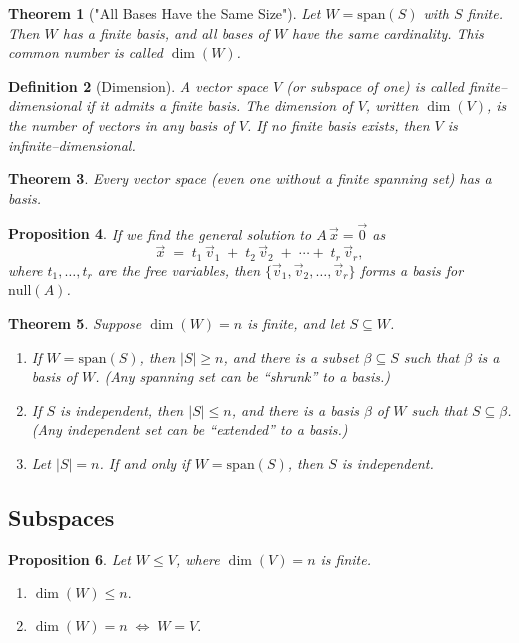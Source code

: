 \documentclass[12pt]{article}
\theoremstyle{break}             %
\newtheorem{thm}{Theorem}          %
\newtheorem{prop}[thm]{Proposition}%
\newtheorem{defn}[thm]{Definition}
\begin{document}
\begin{thm}["All Bases Have the Same Size"]
Let \(W = \mathrm{span}(S)\) with \(S\) finite. Then \(W\) has a finite basis, and \emph{all} bases of \(W\) have the same cardinality. This common number is called \(\dim(W)\).
\end{thm}

\begin{defn}[Dimension]
A vector space \(V\) (or subspace of one) is called \emph{finite–dimensional} if it admits a finite basis.  The \emph{dimension} of \(V\), written \(\dim(V)\), is the number of vectors in any basis of \(V\).  If no finite basis exists, then \(V\) is \emph{infinite–dimensional}.
\end{defn}

\begin{thm}
Every vector space (even one without a finite spanning set) has a basis.
\end{thm}

\begin{prop}
If we find the general solution to \(A\,\vec{x} = \vec{0}\) as 
\[
\vec{x} \;=\; t_1\,\vec{v}_1 \;+\; t_2\,\vec{v}_2 \;+\;\cdots+\; t_r\,\vec{v}_r,
\]
where \(t_1,\dots,t_r\) are the free variables, then \(\{\vec{v}_1,\vec{v}_2,\dots,\vec{v}_r\}\) forms a basis for \(\mathrm{null}(A)\).
\end{prop}

\begin{thm}
Suppose \(\dim(W) = n\) is finite, and let \(S \subseteq W\).
\begin{enumerate}
\item If \(W = \mathrm{span}(S)\), then \(\lvert S\rvert \ge n\), and there is a subset \(\beta \subseteq S\) such that \(\beta\) is a basis of \(W\).  
(Any spanning set can be ``shrunk'' to a basis.)
\item If \(S\) is independent, then \(\lvert S\rvert \le n\), and there is a basis \(\beta\) of \(W\) such that \(S \subseteq \beta\).  
(Any independent set can be ``extended'' to a basis.)
\item Let \(\lvert S\rvert = n\). If and only if \(W = \mathrm{span}(S)\), then \(S\) is independent.
\end{enumerate}
\end{thm}

\subsection{Subspaces}

\begin{prop}
Let \(W \leq V\), where \(\dim(V) = n\) is finite.
\begin{enumerate}
\item \(\dim(W) \le n.\)
\item \(\dim(W) = n \;\Longleftrightarrow\; W = V.\)
\end{enumerate}
\end{prop}
\end{document}
